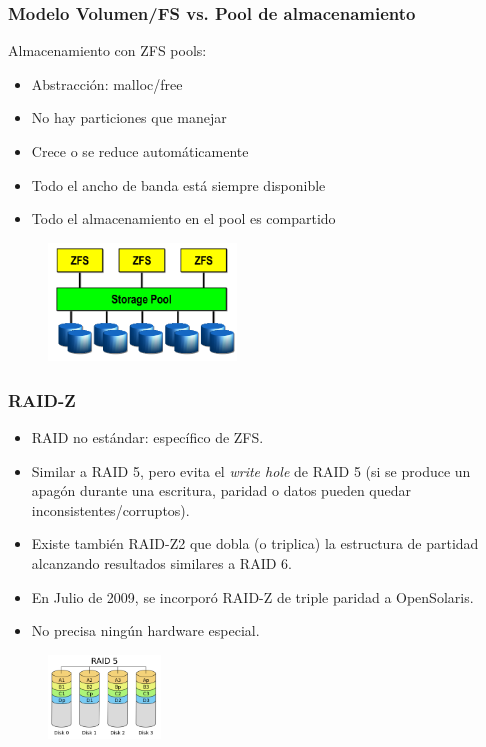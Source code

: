 \documentclass{beamer}
\begin{document}
\begin{frame}
  \frametitle{Modelo Volumen/FS vs. Pool de almacenamiento}

Almacenamiento con ZFS pools:

  \begin{itemize}
    \item Abstracción: malloc/free
    \item No hay particiones que manejar
    \item Crece o se reduce automáticamente
    \item Todo el ancho de banda está siempre disponible 
    \item Todo el almacenamiento en el pool es compartido 
  \end{itemize}
\begin{figure}[h]
\begin{center}
  \includegraphics[width=5cm]{figs/pools.png}
\end{center}
\end{figure}

\end{frame}

\begin{frame}
  \frametitle{RAID-Z}

  \begin{itemize}
\small
    \item RAID no estándar: específico de ZFS.
    \item Similar a RAID 5, pero evita el \textit{write hole} de RAID 5 (si se produce un apagón durante una escritura, paridad o datos pueden quedar inconsistentes/corruptos).
    \item Existe también RAID-Z2 que dobla (o triplica) la estructura de partidad alcanzando resultados similares a RAID 6. 
    \item En Julio de 2009, se incorporó RAID-Z de triple paridad a OpenSolaris. 
    \item No precisa ningún hardware especial.
  \end{itemize}

\normalsize

\begin{figure}[h]
\begin{center}
  \includegraphics[width=3cm]{figs/RAID_5.png}
\end{center}
\end{figure}

\end{frame}
\end{document}
